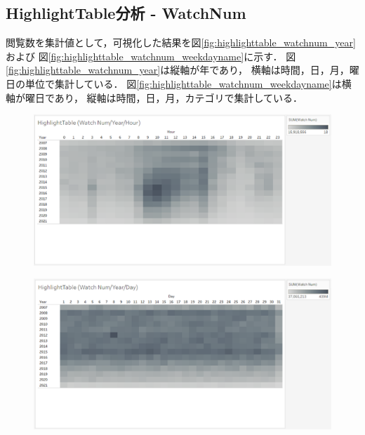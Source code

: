 \documentclass[submit,techrep,noauthor]{ipsj}
\begin{document}
\newpage

\subsection{HighlightTable分析 - WatchNum}

閲覧数を集計値として，可視化した結果を図\ref{fig:highlighttable_watchnum_year}および
図\ref{fig:highlighttable_watchnum_weekdayname}に示す．
%
図\ref{fig:highlighttable_watchnum_year}は縦軸が年であり，
横軸は時間，日，月，曜日の単位で集計している．
図\ref{fig:highlighttable_watchnum_weekdayname}は横軸が曜日であり，
縦軸は時間，日，月，カテゴリで集計している．

\vspace{-1.5zh}
\begin{figure}[h]
  \begin{minipage}[b]{0.49\columnwidth}
    \centering
    \hspace{-1.0zh}
    \includegraphics[width=\columnwidth]{./eps/HighlightTable_WatchNum_YearHour.eps}
    \label{fig:highlighttable_watchnum_year_hour}
  \end{minipage}
  \begin{minipage}[b]{0.49\columnwidth}
    \centering
    \includegraphics[width=\columnwidth]{./eps/HighlightTable_WatchNum_YearDay.eps}

\end{minipage}
\end{figure}
\end{document}
